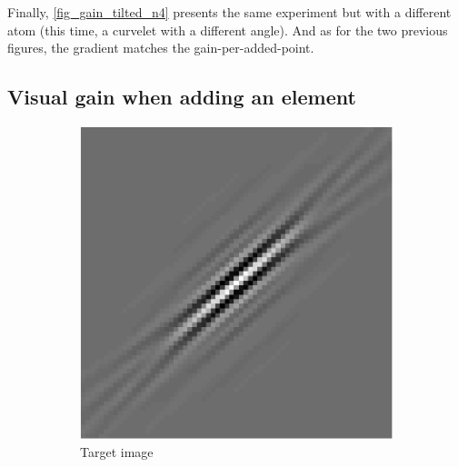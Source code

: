 Finally, \cref{fig_gain_tilted_n4} presents the same experiment but with a different atom (this time, a curvelet with a different angle). And as for the two previous figures, the gradient matches the gain-per-added-point.

\subsection{Visual gain when adding an element}

\begin{figure}[!ht]\centering
\begin{subfigure}[b]{0.32\linewidth}\centering
\includegraphics[width=\linewidth]{figures/before_after/xp_128x128_sc2_angl1_K3_S3_node4before_target.pdf}
	\caption{Target image}
\end{subfigure}
\begin{subfigure}[b]{0.32\linewidth}\centering

\end{subfigure}
\end{figure}

